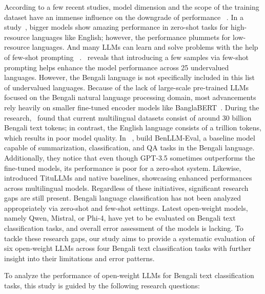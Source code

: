 \documentclass[10pt,letterpaper]{article}
\begin{document}
According to a few recent studies, model dimension and the scope of the training dataset have an immense influence on the downgrade of performance ~\cite{b47}. In a study~\cite{b35}, bigger models show amazing performance in zero-shot tasks for high-resource languages like English; however, the performance plummets for low-resource languages. And many LLMs can learn and solve problems with the help of few-shot prompting ~\cite{b46}.~\cite{b43} reveals that introducing a few samples via few-shot prompting helps enhance the model performance across 25 undervalued languages. However, the Bengali language is not specifically included in this list of undervalued languages. Because of the lack of large-scale pre-trained LLMs focused on the Bengali natural language processing domain, most advancements rely heavily on smaller fine-tuned encoder models like BanglaBERT~\cite{b4}. During the research,~\cite{b6} found that current multilingual datasets consist of around 30 billion Bengali text tokens; in contrast, the English language consists of a trillion tokens, which results in poor model quality. In ~\cite{b3}, build BenLLM-Eval, a baseline model capable of summarization, classification, and QA tasks in the Bengali language. Additionally, they notice that even though GPT-3.5 sometimes outperforms the fine-tuned models, its performance is poor for a zero-shot system. Likewise,~\cite{b21} introduced TituLLMs and native baselines, showcasing enhanced performances across multilingual models. Regardless of these initiatives, significant research gaps are still present. Bengali language classification has not been analyzed appropriately via zero-shot and few-shot settings. Latest open-weight models, namely Qwen, Mistral, or Phi-4, have yet to be evaluated on Bengali text classification tasks, and overall error assessment of the models is lacking. To tackle these research gaps, our study aims to provide a systematic evaluation of six open-weight LLMs across four Bengali text classification tasks with further insight into their limitations and error patterns.

To analyze the performance of open-weight LLMs for Bengali text classification tasks, this study is guided by the following research questions:
\end{document}
